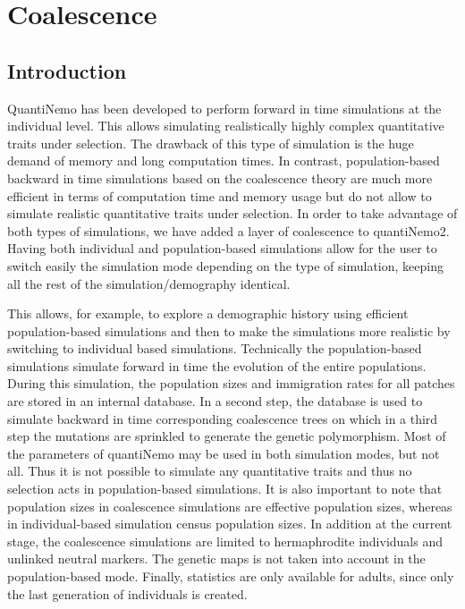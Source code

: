 \documentclass[letterpaper,12pt,oneside]{book}
\begin{document}
\chapter{Coalescence}\label{chap:Coalescence}
\section{Introduction}
QuantiNemo has been developed to perform forward in time simulations at the individual level. This allows simulating realistically highly complex quantitative traits under selection. The drawback of this type of simulation is the huge demand of memory and long computation times. In contrast, population-based backward in time simulations based on the coalescence theory are much more efficient in terms of computation time and memory usage but do not allow to simulate realistic quantitative traits under selection. In order to take advantage of both types of simulations, we have added a layer of coalescence to quantiNemo2. Having both individual and population-based simulations allow for the user to switch easily the simulation mode depending on the type of simulation, keeping all the rest of the simulation/demography identical. 

This allows, for example, to explore a demographic history using efficient population-based simulations and then to make the simulations more realistic by switching to individual based simulations. Technically the population-based simulations simulate forward in time the evolution of the entire populations. During this simulation, the population sizes and immigration rates for all patches are stored in an internal database. In a second step, the database is used to simulate backward in time corresponding coalescence trees on which in a third step the mutations are sprinkled to generate the genetic polymorphism.
Most of the parameters of quantiNemo may be used in both simulation modes, but not all. Thus it is not possible to simulate any quantitative traits and thus no selection acts in population-based simulations. It is also important to note that population sizes in coalescence simulations are effective population sizes, whereas in individual-based simulation census population sizes. In addition at the current stage, the coalescence simulations are limited to hermaphrodite individuals and unlinked neutral markers. The genetic maps is not taken into account in the population-based mode. Finally, statistics are only available for adults, since only the last generation of individuals is created. 
\end{document}
